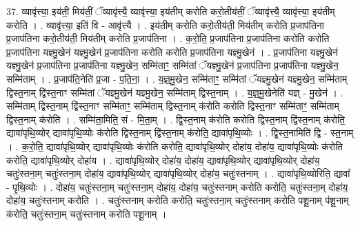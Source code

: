 \documentclass[17pt]{extarticle}
\begin{document}
37. व्यावृ॑त्त्या॒ इय॑ती॒ मिय॑तीं॒ ॅव्यावृ॑त्त्यै॒ व्यावृ॑त्त्या॒ इय॑तीम् करोति करो॒तीय॑तीं॒ ॅव्यावृ॑त्त्यै॒ व्यावृ॑त्त्या॒ इय॑तीम् करोति । . व्यावृ॑त्त्या॒ इति॑ वि - आवृ॑त्त्यै । . इय॑तीम् करोति करो॒तीय॑ती॒ मिय॑तीम् करोति प्र॒जाप॑तिना प्र॒जाप॑तिना करो॒तीय॑ती॒ मिय॑तीम् करोति प्र॒जाप॑तिना । . क॒रो॒ति॒ प्र॒जाप॑तिना प्र॒जाप॑तिना करोति करोति प्र॒जाप॑तिना यज्ञ्मु॒खेन॑ यज्ञ्मु॒खेन॑ प्र॒जाप॑तिना करोति करोति प्र॒जाप॑तिना यज्ञ्मु॒खेन॑ । . प्र॒जाप॑तिना यज्ञ्मु॒खेन॑ यज्ञ्मु॒खेन॑ प्र॒जाप॑तिना प्र॒जाप॑तिना यज्ञ्मु॒खेन॒ सम्मि॑ताꣳ॒॒ सम्मि॑तां ॅयज्ञ्मु॒खेन॑ प्र॒जाप॑तिना प्र॒जाप॑तिना यज्ञ्मु॒खेन॒ सम्मि॑ताम् । . प्र॒जाप॑ति॒नेति॑ प्र॒जा - प॒ति॒ना॒ । . य॒ज्ञ्॒मु॒खेन॒ सम्मि॑ताꣳ॒॒ सम्मि॑तां ॅयज्ञ्मु॒खेन॑ यज्ञ्मु॒खेन॒ सम्मि॑ताम् द्विस्त॒नाम् द्वि॑स्त॒नाꣳ सम्मि॑तां ॅयज्ञ्मु॒खेन॑ यज्ञ्मु॒खेन॒ सम्मि॑ताम् द्विस्त॒नाम् । . य॒ज्ञ्॒मु॒खेनेति॑ यज्ञ् - मु॒खेन॑ । . सम्मि॑ताम् द्विस्त॒नाम् द्वि॑स्त॒नाꣳ सम्मि॑ताꣳ॒॒ सम्मि॑ताम् द्विस्त॒नाम् क॑रोति करोति द्विस्त॒नाꣳ सम्मि॑ताꣳ॒॒ सम्मि॑ताम् द्विस्त॒नाम् क॑रोति । . सम्मि॑ता॒मिति॒ सं - मि॒ता॒म् । . द्वि॒स्त॒नाम् क॑रोति करोति द्विस्त॒नाम् द्वि॑स्त॒नाम् क॑रोति॒ द्यावा॑पृथि॒व्योर् द्यावा॑पृथि॒व्योः क॑रोति द्विस्त॒नाम् द्वि॑स्त॒नाम् क॑रोति॒ द्यावा॑पृथि॒व्योः । . द्वि॒स्त॒नामिति॑ द्वि - स्त॒नाम् । . क॒रो॒ति॒ द्यावा॑पृथि॒व्योर् द्यावा॑पृथि॒व्योः क॑रोति करोति॒ द्यावा॑पृथि॒व्योर् दोहा॑य॒ दोहा॑य॒ द्यावा॑पृथि॒व्योः क॑रोति करोति॒ द्यावा॑पृथि॒व्योर् दोहा॑य । . द्यावा॑पृथि॒व्योर् दोहा॑य॒ दोहा॑य॒ द्यावा॑पृथि॒व्योर् द्यावा॑पृथि॒व्योर् दोहा॑य॒ चतुः॑स्तना॒म् चतुः॑स्तना॒म् दोहा॑य॒ द्यावा॑पृथि॒व्योर् द्यावा॑पृथि॒व्योर् दोहा॑य॒ चतुः॑स्तनाम् । . द्यावा॑पृथि॒व्योरिति॒ द्यावा᳚ - पृ॒थि॒व्योः । . दोहा॑य॒ चतुः॑स्तना॒म् चतुः॑स्तना॒म् दोहा॑य॒ दोहा॑य॒ चतुः॑स्तनाम् करोति करोति॒ चतुः॑स्तना॒म् दोहा॑य॒ दोहा॑य॒ चतुः॑स्तनाम् करोति । . चतुः॑स्तनाम् करोति करोति॒ चतुः॑स्तना॒म् चतुः॑स्तनाम् करोति पशू॒नाम् प॑शू॒नाम् क॑रोति॒ चतुः॑स्तना॒म् चतुः॑स्तनाम् करोति पशू॒नाम् । \newline
\end{document}
